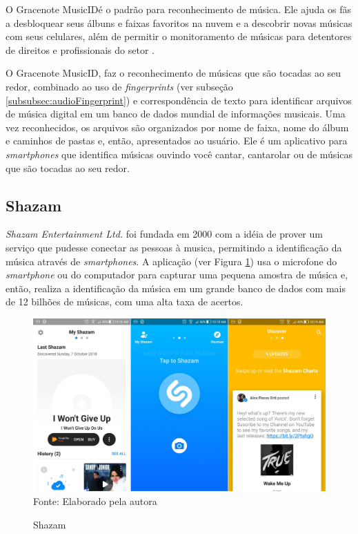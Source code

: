\begin{citacao}
O Gracenote MusicID\textregistered é o padrão para reconhecimento de música. Ele ajuda os fãs a desbloquear seus álbuns e faixas favoritos na nuvem e a descobrir novas músicas com seus celulares, além de permitir o monitoramento de músicas para detentores de direitos e profissionais do setor \cite{musicid1998}.
\end{citacao}

O Gracenote MusicID\textregistered, faz o reconhecimento de músicas que são tocadas ao seu redor, combinado ao uso de \textit{fingerprints} (ver subseção \ref{subsubsec:audioFingerprint}) e correspondência de texto para identificar arquivos de música digital em um banco de dados mundial de informações musicais. Uma vez reconhecidos, os arquivos são organizados por nome de faixa, nome do álbum e caminhos de pastas e, então, apresentados ao usuário. Ele é um aplicativo para \textit{smartphones} que identifica músicas ouvindo você cantar, cantarolar ou de músicas que são tocadas ao seu redor.

\subsection{Shazam} \label{subsec:shazam}
\textit{Shazam Entertainment Ltd.} foi fundada em 2000 com a idéia de prover um serviço que pudesse conectar as pessoas à musica, permitindo a identificação da música através de \textit{smartphones}. A aplicação (ver Figura \ref{fig:shazam}) usa o microfone do \textit{smartphone} ou do computador para capturar uma pequena amostra de música e, então, realiza a identificação da música em um grande banco de dados com mais de 12 bilhões de músicas, com uma alta taxa de acertos.

\begin{figure}[!htb]
   \centering
   \caption{Shazam}\label{fig:shazam} 
   \includegraphics[scale=0.17]{figuras/shazam.jpg}
   \\Fonte: Elaborado pela autora
\end{figure}

